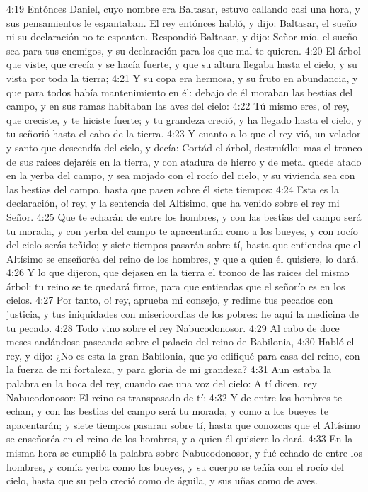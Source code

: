 4:19 Entónces Daniel, cuyo nombre era Baltasar, estuvo callando casi una hora, y sus pensamientos le espantaban. El rey entónces habló, y dijo: Baltasar, el sueño ni su declaración no te espanten. Respondió Baltasar, y dijo: Señor mío, el sueño sea para tus enemigos, y su declaración para los que mal te quieren.
4:20 El árbol que viste, que crecía y se hacía fuerte, y que su altura llegaba hasta el cielo, y su vista por toda la tierra;
4:21 Y su copa era hermosa, y su fruto en abundancia, y que para todos había mantenimiento en él: debajo de él moraban las bestias del campo, y en sus ramas habitaban las aves del cielo:
4:22 Tú mismo eres, o! rey, que creciste, y te hiciste fuerte; y tu grandeza creció, y ha llegado hasta el cielo, y tu señorió hasta el cabo de la tierra.
4:23 Y cuanto a lo que el rey vió, un velador y santo que descendía del cielo, y decía: Cortád el árbol, destruídlo: mas el tronco de sus raices dejaréis en la tierra, y con atadura de hierro y de metal quede atado en la yerba del campo, y sea mojado con el rocío del cielo, y su vivienda sea con las bestias del campo, hasta que pasen sobre él siete tiempos:
4:24 Esta es la declaración, o! rey, y la sentencia del Altísimo, que ha venido sobre el rey mi Señor.
4:25 Que te echarán de entre los hombres, y con las bestias del campo será tu morada, y con yerba del campo te apacentarán como a los bueyes, y con rocío del cielo serás teñido; y siete tiempos pasarán sobre tí, hasta que entiendas que el Altísimo se enseñoréa del reino de los hombres, y que a quien él quisiere, lo dará.
4:26 Y lo que dijeron, que dejasen en la tierra el tronco de las raices del mismo árbol: tu reino se te quedará firme, para que entiendas que el señorío es en los cielos.
4:27 Por tanto, o! rey, aprueba mi consejo, y redime tus pecados con justicia, y tus iniquidades con misericordias de los pobres: he aquí la medicina de tu pecado.
4:28 Todo vino sobre el rey Nabucodonosor.
4:29 Al cabo de doce meses andándose paseando sobre el palacio del reino de Babilonia,
4:30 Habló el rey, y dijo: ¿No es esta la gran Babilonia, que yo edifiqué para casa del reino, con la fuerza de mi fortaleza, y para gloria de mi grandeza?
4:31 Aun estaba la palabra en la boca del rey, cuando cae una voz del cielo: A tí dicen, rey Nabucodonosor: El reino es transpasado de tí:
4:32 Y de entre los hombres te echan, y con las bestias del campo será tu morada, y como a los bueyes te apacentarán; y siete tiempos pasaran sobre tí, hasta que conozcas que el Altísimo se enseñoréa en el reino de los hombres, y a quien él quisiere lo dará.
4:33 En la misma hora se cumplió la palabra sobre Nabucodonosor, y fué echado de entre los hombres, y comía yerba como los bueyes, y su cuerpo se teñía con el rocío del cielo, hasta que su pelo creció como de águila, y sus uñas como de aves.
